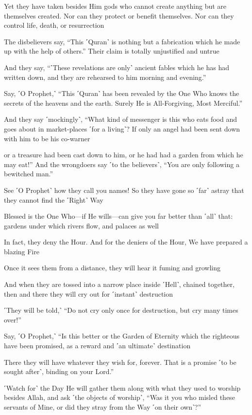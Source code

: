 Yet they have taken besides Him gods who cannot create anything but are themselves created. Nor can they protect or benefit themselves. Nor can they control life, death, or resurrection

The disbelievers say, “This ˹Quran˺ is nothing but a fabrication which he made up with the help of others.” Their claim is totally unjustified and untrue

And they say, “˹These revelations are only˺ ancient fables which he has had written down, and they are rehearsed to him morning and evening.”

Say, ˹O Prophet,˺ “This ˹Quran˺ has been revealed by the One Who knows the secrets of the heavens and the earth. Surely He is All-Forgiving, Most Merciful.”

And they say ˹mockingly˺, “What kind of messenger is this who eats food and goes about in market-places ˹for a living˺? If only an angel had been sent down with him to be his co-warner

or a treasure had been cast down to him, or he had had a garden from which he may eat!” And the wrongdoers say ˹to the believers˺, “You are only following a bewitched man.”

See ˹O Prophet˺ how they call you names! So they have gone so ˹far˺ astray that they cannot find the ˹Right˺ Way

Blessed is the One Who—if He wills—can give you far better than ˹all˺ that: gardens under which rivers flow, and palaces as well

In fact, they deny the Hour. And for the deniers of the Hour, We have prepared a blazing Fire

Once it sees them from a distance, they will hear it fuming and growling

And when they are tossed into a narrow place inside ˹Hell˺, chained together, then and there they will cry out for ˹instant˺ destruction

˹They will be told,˺ “Do not cry only once for destruction, but cry many times over!”

Say, ˹O Prophet,˺ “Is this better or the Garden of Eternity which the righteous have been promised, as a reward and ˹an ultimate˺ destination

There they will have whatever they wish for, forever. That is a promise ˹to be sought after˺, binding on your Lord.”

˹Watch for˺ the Day He will gather them along with what they used to worship besides Allah, and ask ˹the objects of worship˺, “Was it you who misled these servants of Mine, or did they stray from the Way ˹on their own˺?”

